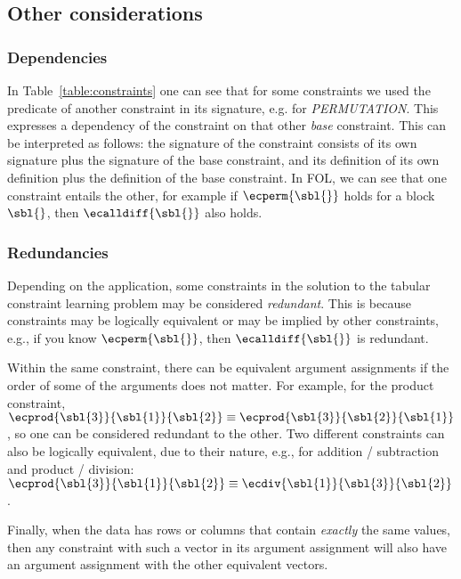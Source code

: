 \subsection{Other considerations}

\subsubsection{Dependencies}
\label{sec:form:dependencies}
In Table~\ref{table:constraints} one can see that for some constraints we used the predicate of another constraint in its signature, e.g. for \textit{PERMUTATION}.
This expresses a dependency of the constraint on that other \textit{base} constraint.
This can be interpreted as follows: the signature of the constraint consists of its own signature plus the signature of the base constraint, and its definition of its own definition plus the definition of the base constraint.
In FOL, we can see that one constraint entails the other, for example if $\ecperm{\sbl{}}$ holds for a block $\sbl{}$, then $\ecalldiff{\sbl{}}$ also holds.



\subsubsection{Redundancies}
\label{sec:form:redundancies}
Depending on the application, some constraints in the solution to the tabular constraint learning problem may be considered \textit{redundant}. This is because constraints may be logically equivalent or may be implied by other constraints, e.g., if you know $\ecperm{\sbl{}}$, then $\ecalldiff{\sbl{}}$ is redundant.

Within the same constraint, there can be equivalent argument assignments if the order of some of the arguments does not matter. For example, for the product constraint, $\ecprod{\sbl{3}}{\sbl{1}}{\sbl{2}} \equiv \ecprod{\sbl{3}}{\sbl{2}}{\sbl{1}}$, so one can be considered redundant to the other.
Two different constraints can also be logically equivalent, due to their nature, e.g., for addition / subtraction and product / division: $\ecprod{\sbl{3}}{\sbl{1}}{\sbl{2}} \equiv \ecdiv{\sbl{1}}{\sbl{3}}{\sbl{2}}$.

Finally, when the data has rows or columns that contain \textit{exactly} the same values, then any constraint with such a vector in its argument assignment will also have an argument assignment with the other equivalent vectors.

